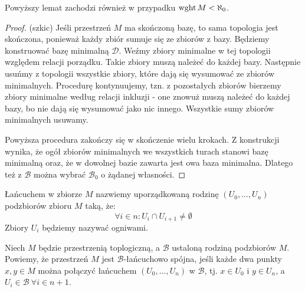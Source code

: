 \begin{fact}
  Powyższy lemat zachodzi również w przypadku $\operatorname{wght} M < \aleph_0$.
  \begin{proof}(szkic)
    Jeśli przestrzeń $M$ ma skończoną bazę, to sama topologia jest skończona, ponieważ każdy zbiór sumuje się ze zbiorów z bazy. Będziemy konstruować bazę minimalną $\mathcal D$. Weźmy zbiory minimalne w tej topologii względem relacji porządku. Takie zbiory muszą należeć do każdej bazy. Następnie usuńmy z topologii wszystkie zbiory, które dają się wysumować ze zbiorów minimalnych. Procedurę kontynuujemy, tzn. z pozostałych zbiorów bierzemy zbiory minimalne według relacji inkluzji - one znowuż muszą należeć do każdej bazy, bo nie dają się wysumować jako nic innego. Wszystkie sumy zbiorów minimalnych usuwamy.
    
    Powyższa procedura zakończy się w skończenie wielu krokach. Z konstrukcji wynika, że ogół zbiorów minimalnych we wszystkich turach stanowi bazę minimalną oraz, że w dowolnej bazie zawarta jest owa baza minimalna. Dlatego też z $\mathcal B$ można wybrać $\mathcal B_0$ o żądanej własności.
  \end{proof}
\end{fact}
 
\begin{df}
  Łańcuchem w zbiorze $M$ nazwiemy uporządkowaną rodzinę $(U_0, \ldots, U_n)$ podzbiorów zbioru $M$ taką, że:
  \[
    \forall i \in n: U_i \cap U_{i+1} \neq \emptyset
  \]
  Zbiory $U_i$ będziemy nazywać ogniwami.
\end{df}
 
\begin{df}
  Niech $M$ będzie przestrzenią toplogiczną, a $\mathcal B$ ustaloną rodziną podzbiorów $M$. Powiemy, że przestrzeń $M$ jest $\mathcal B$-łańcuchowo spójna, jeśli każde dwa punkty $x,y \in M$ można połączyć łańcuchem $(U_0, \ldots, U_n)$ w $\mathcal B$, tj. $x \in U_0$ i $y \in U_n$, a $U_i \in \mathcal B\ \forall i \in n+1$.
\end{df}
 
